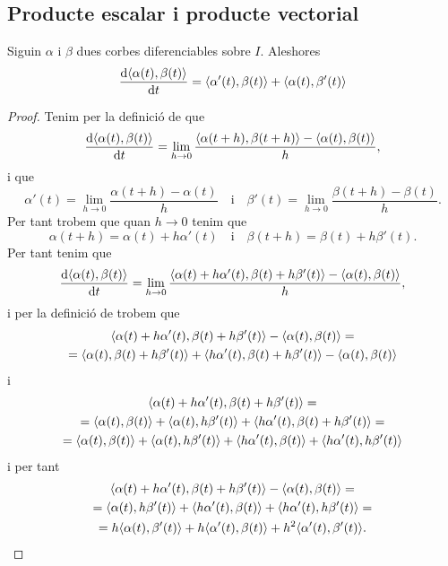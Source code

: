 \documentclass[../Apunts.tex]{subfiles}
\begin{document}
	\subsection{Producte escalar i producte vectorial}
	\begin{proposition}
		\label{prop:derivada del producte escalar de dues corbes}
		Siguin \(\alpha\) i \(\beta\) dues corbes diferenciables sobre \(I\). Aleshores
		\[\frac{\diff\prodesc{\alpha(t)}{\beta(t)}}{\diff t}=\prodesc{\alpha'(t)}{\beta(t)}+\prodesc{\alpha(t)}{\beta'(t)}\]
		\begin{proof}
			Tenim per la definició de  que
			\[\frac{\diff\prodesc{\alpha(t)}{\beta(t)}}{\diff t}=\lim_{h\to0}\frac{\prodesc{\alpha(t+h)}{\beta(t+h)}-\prodesc{\alpha(t)}{\beta(t)}}{h},\]
			i que
			\[\alpha'(t)=\lim_{h\to0}\frac{\alpha(t+h)-\alpha(t)}{h}\quad\text{i}\quad\beta'(t)=\lim_{h\to0}\frac{\beta(t+h)-\beta(t)}{h}.\]
			Per tant trobem que quan \(h\to0\) tenim que
			\[\alpha(t+h)=\alpha(t)+h\alpha'(t)\quad\text{i}\quad\beta(t+h)=\beta(t)+h\beta'(t).\]
			Per tant tenim que
			\[\frac{\diff\prodesc{\alpha(t)}{\beta(t)}}{\diff t}=\lim_{h\to0}\frac{\prodesc{\alpha(t)+h\alpha'(t)}{\beta(t)+h\beta'(t)}-\prodesc{\alpha(t)}{\beta(t)}}{h},\]
			i per la definició de  trobem que
			\begin{multline*}
				\prodesc{\alpha(t)+h\alpha'(t)}{\beta(t)+h\beta'(t)}-\prodesc{\alpha(t)}{\beta(t)}=\\
				=\prodesc{\alpha(t)}{\beta(t)+h\beta'(t)}+\prodesc{h\alpha'(t)}{\beta(t)+h\beta'(t)}-\prodesc{\alpha(t)}{\beta(t)}
			\end{multline*}
			i
			\begin{multline*}
				\prodesc{\alpha(t)+h\alpha'(t)}{\beta(t)+h\beta'(t)}=\\
				=\prodesc{\alpha(t)}{\beta(t)}+\prodesc{\alpha(t)}{h\beta'(t)}+\prodesc{h\alpha'(t)}{\beta(t)+h\beta'(t)}=\\
				=\prodesc{\alpha(t)}{\beta(t)}+\prodesc{\alpha(t)}{h\beta'(t)}+\prodesc{h\alpha'(t)}{\beta(t)}+\prodesc{h\alpha'(t)}{h\beta'(t)}
			\end{multline*}
			i per tant
			\begin{multline*}
				\prodesc{\alpha(t)+h\alpha'(t)}{\beta(t)+h\beta'(t)}-\prodesc{\alpha(t)}{\beta(t)}=\\
				=\prodesc{\alpha(t)}{h\beta'(t)}+\prodesc{h\alpha'(t)}{\beta(t)}+\prodesc{h\alpha'(t)}{h\beta'(t)}=\\
				=h\prodesc{\alpha(t)}{\beta'(t)}+h\prodesc{\alpha'(t)}{\beta(t)}+h^{2}\prodesc{\alpha'(t)}{\beta'(t)}.

\end{multline*}
\end{proof}
\end{proposition}
\end{document}
